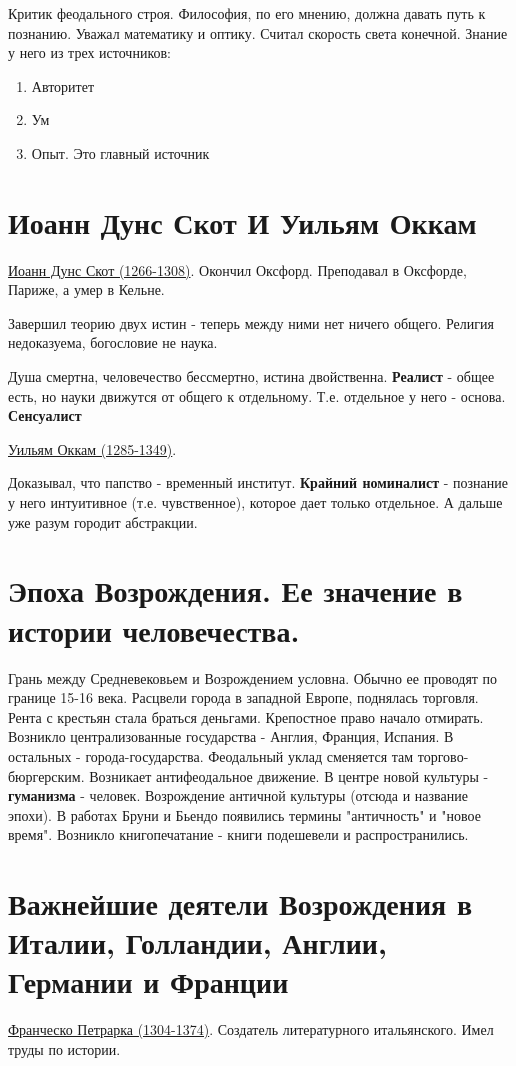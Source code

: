 \documentclass[12pt,a4paper]{article}
\begin{document}
Критик феодального строя. Философия, по его мнению, должна давать путь к познанию. Уважал математику и оптику. Считал скорость света конечной. Знание у него из трех источников:
\begin{enumerate}
\item Авторитет
\item Ум
\item Опыт. Это главный источник
\end{enumerate}

\section{Иоанн Дунс Скот И Уильям Оккам}
\hspace{8pt} 
\underline{Иоанн Дунс Скот (1266-1308)}. Окончил Оксфорд. Преподавал в Оксфорде, Париже, а умер в Кельне.

Завершил теорию двух истин - теперь между ними нет ничего общего. Религия недоказуема, богословие не наука. 

Душа смертна, человечество бессмертно, истина двойственна. \textbf{Реалист} - общее есть, но науки движутся от общего к отдельному. Т.е. отдельное у  него - основа. \textbf{Сенсуалист}
 
\underline{Уильям Оккам (1285-1349)}. 

Доказывал, что папство - временный институт. \textbf{Крайний номиналист} - познание у него интуитивное (т.е. чувственное), которое дает только отдельное. А дальше уже разум городит абстракции.

\section{Эпоха Возрождения. Ее значение в истории человечества.}
Грань между Средневековьем и Возрождением условна. Обычно ее проводят по границе 15-16 века. Расцвели города в западной Европе, поднялась торговля. Рента с крестьян стала браться деньгами. Крепостное право начало отмирать. Возникло централизованные государства - Англия, Франция, Испания. В остальных - города-государства. Феодальный уклад сменяется там торгово-бюргерским. Возникает антифеодальное движение. В центре новой культуры - \textbf{гуманизма} - человек. Возрождение античной культуры (отсюда и название эпохи). В работах Бруни и Бьендо появились термины "античность" и "новое время". Возникло книгопечатание - книги подешевели и распространились. 

\section{Важнейшие деятели Возрождения в Италии, Голландии, Англии, Германии и Франции}
\hspace{8pt} 
\underline{Франческо Петрарка (1304-1374)}. 
Создатель литературного итальянского. Имел труды по истории.
\end{document}
